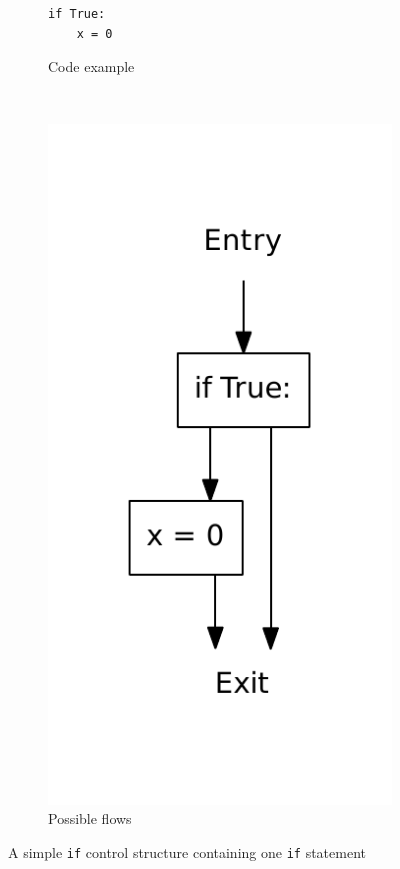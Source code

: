 \begin{figure}[H]
  \centering
  \begin{subfigure}[b]{0.4\textwidth}
    \begin{lstlisting}[style=python]
if True:
    x = 0
    \end{lstlisting}
    \caption{Code example}
    \label{python:if:simple:code}
  \end{subfigure}
  ~ %
  \begin{subfigure}[b]{0.4\textwidth}
    \centering
    \includegraphics[scale=.5]{./figures/if.pdf}
    \caption{Possible flows}
    \label{python:if:simple:flow}
  \end{subfigure}
  \caption{A simple \texttt{if} control structure containing one \texttt{if} statement}
  \label{python:if:simple}
\end{figure}

